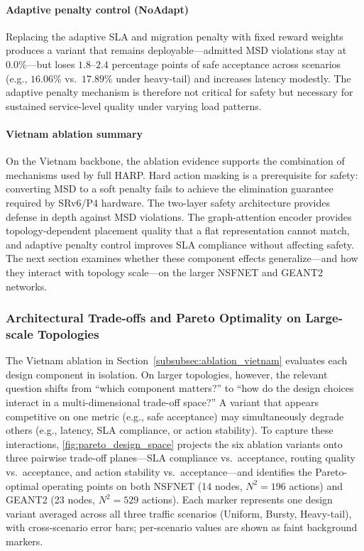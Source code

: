 \documentclass[final,5p]{elsarticle}
\begin{document}
\paragraph{Adaptive penalty control (NoAdapt)}
Replacing the adaptive SLA and migration penalty with fixed reward weights produces a variant that remains deployable---admitted MSD violations stay at \(0.0\%\)---but loses \(1.8\)--\(2.4\) percentage points of safe acceptance across scenarios (e.g., \(16.06\%\) vs.\ \(17.89\%\) under heavy-tail) and increases latency modestly. The adaptive penalty mechanism is therefore not critical for safety but necessary for sustained service-level quality under varying load patterns.

\paragraph{Vietnam ablation summary}
On the Vietnam backbone, the ablation evidence supports the combination of mechanisms used by full HARP. Hard action masking is a prerequisite for safety: converting MSD to a soft penalty fails to achieve the elimination guarantee required by SRv6/P4 hardware. The two-layer safety architecture provides defense in depth against MSD violations. The graph-attention encoder provides topology-dependent placement quality that a flat representation cannot match, and adaptive penalty control improves SLA compliance without affecting safety. The next section examines whether these component effects generalize---and how they interact with topology scale---on the larger NSFNET and GEANT2 networks.

\subsubsection{Architectural Trade-offs and Pareto Optimality on Large-scale Topologies}
\label{subsubsec:pareto_tradeoffs}

The Vietnam ablation in Section~\ref{subsubsec:ablation_vietnam} evaluates each design component in isolation. On larger topologies, however, the relevant question shifts from ``which component matters?'' to ``how do the design choices interact in a multi-dimensional trade-off space?'' A variant that appears competitive on one metric (e.g., safe acceptance) may simultaneously degrade others (e.g., latency, SLA compliance, or action stability). To capture these interactions, \autoref{fig:pareto_design_space} projects the six ablation variants onto three pairwise trade-off planes---SLA compliance vs.\ acceptance, routing quality vs.\ acceptance, and action stability vs.\ acceptance---and identifies the Pareto-optimal operating points on both NSFNET (14 nodes, $N^2{=}196$ actions) and GEANT2 (23 nodes, $N^2{=}529$ actions). Each marker represents one design variant averaged across all three traffic scenarios (Uniform, Bursty, Heavy-tail), with cross-scenario error bars; per-scenario values are shown as faint background markers.
\end{document}
